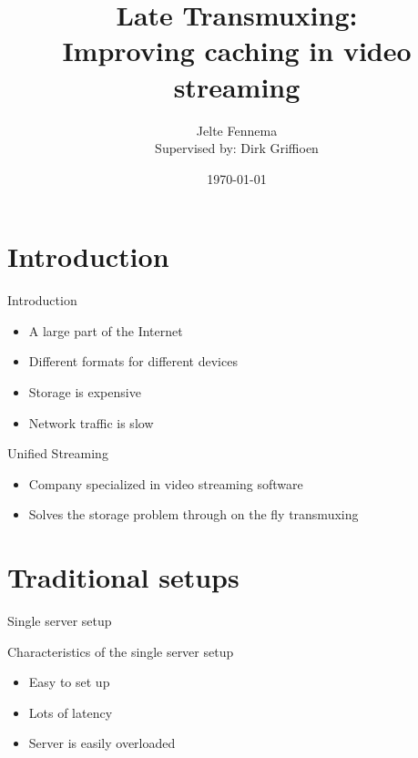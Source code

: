 \documentclass[xcolor=svgnames]{beamer}
\title[Late Transmuxing\hspace{2em}]{Late Transmuxing:\\Improving caching in video streaming}
\author[Jelte Fennema]{Jelte Fennema\\\footnotesize{Supervised by: Dirk Griffioen}}
\date{\today}
\institute{University of Amsterdam}
\begin{document}
\maketitle

\section{Introduction}

\begin{frame}{Introduction}
  \begin{itemize}
      \item A large part of the Internet
      \item Different formats for different devices
      \item Storage is expensive
      \item Network traffic is slow
  \end{itemize}
\end{frame}

\begin{frame}{Unified Streaming}
  \begin{itemize}
      \item Company specialized in video streaming software
      \item Solves the storage problem through on the fly transmuxing
  \end{itemize}
\end{frame}

\section{Traditional setups}

\begin{frame}{Single server setup}
    \begin{figure}

        \resizebox{\textwidth}{!}{%
            
        }
    \end{figure}
\end{frame}
\begin{frame}{Characteristics of the single server setup}
    \begin{itemize}
        \item Easy to set up

        \item Lots of latency

        \item Server is easily overloaded

    \end{itemize}
\end{frame}
\end{document}
